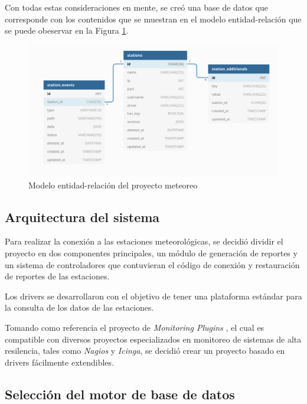Con todas estas consideraciones en mente, se creó una base de datos que corresponde con los contenidos que se muestran en el modelo entidad-relación que se puede obeservar en la Figura \ref{fig:diagrama_base_de_datos}.

\begin{figure}[!ht]
	\centering
	\includegraphics[width=0.86\linewidth]{images/diagrams/database_diagram.png}
	\caption{Modelo entidad-relación del proyecto meteoreo}
	\label{fig:diagrama_base_de_datos}
\end{figure}

\subsection{Arquitectura del sistema}

Para realizar la conexión a las estaciones meteorológicas, se decidió dividir el proyecto en dos componentes principales, un módulo de generación de reportes y un sistema de controladores que contuvieran el código de conexión y restauración de reportes de las estaciones.

Los drivers se desarrollaron con el objetivo de tener una plataforma estándar para la consulta de los datos de las estaciones.

Tomando como referencia el proyecto de \textit{Monitoring Plugins} \cite{monitoring_plugins}, el cual es compatible con diversos proyectos especializados en monitoreo de sistemas de alta resilencia, tales como \textit{Nagios} y \textit{Icinga}, se decidió crear un proyecto basado en drivers fácilmente extendibles.


\subsection{Selección del motor de base de datos}

